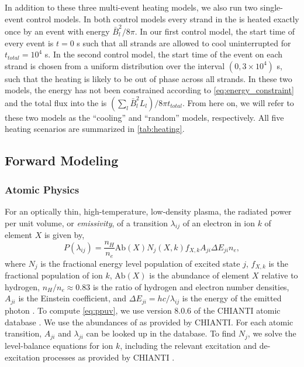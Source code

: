 In addition to these three multi-event heating models, we also run two single-event control models. In both control models every strand in the \AR{} is heated exactly once by an event with energy $\bar{B}_l^2/8\pi$. In our first control model, the start time of every event is $t=0$ s such that all strands are allowed to cool uninterrupted for $t_{total}=10^4$ s. In the second control model, the start time of the event on each strand is chosen from a uniform distribution over the interval $(0, 3\times10^4)$ s, such that the heating is likely to be out of phase across all strands. In these two models, the energy has not been constrained according to \autoref{eq:energy_constraint} and the total flux into the \AR{} is $(\sum_{l}\bar{B}_l^2L_l)/8\pi t_{total}$. From here on, we will refer to these two models as the ``cooling'' and ``random'' models, respectively. All five heating scenarios are summarized in \autoref{tab:heating}.

\subsection{Forward Modeling}\label{forward}

\subsubsection{Atomic Physics}\label{atomic}

For an optically thin, high-temperature, low-density plasma, the radiated power per unit volume, or \textit{emissivity}, of a transition $\lambda_{ij}$ of an electron in ion $k$ of element $X$ is given by,
\begin{equation}
    \label{eq:ppuv}
    P(\lambda_{ij}) = \frac{n_H}{n_e}\mathrm{Ab}(X)N_j(X,k)f_{X,k}A_{ji}\Delta E_{ji}n_e,
\end{equation}
where $N_j$ is the fractional energy level population of excited state $j$, $f_{X,k}$ is the fractional population of ion $k$, $\mathrm{Ab}(X)$ is the abundance of element $X$ relative to hydrogen, $n_H/n_e\approx0.83$ is the ratio of hydrogen and electron number densities, $A_{ji}$ is the Einstein coefficient, and $\Delta E_{ji}=hc/\lambda_{ij}$ is the energy of the emitted photon \citep[see][]{mason_spectroscopic_1994,del_zanna_solar_2018}. To compute \autoref{eq:ppuv}, we use version 8.0.6 of the CHIANTI atomic database \citep{dere_chianti_1997,young_chianti_2016}. We use the abundances of \citet{feldman_potential_1992} as provided by CHIANTI. For each atomic transition, $A_{ji}$ and $\lambda_{ji}$ can be looked up in the database. To find $N_j$, we solve the level-balance equations for ion $k$, including the relevant excitation and de-excitation processes as provided by CHIANTI \citep[see section 3.3 of][]{del_zanna_solar_2018}.

